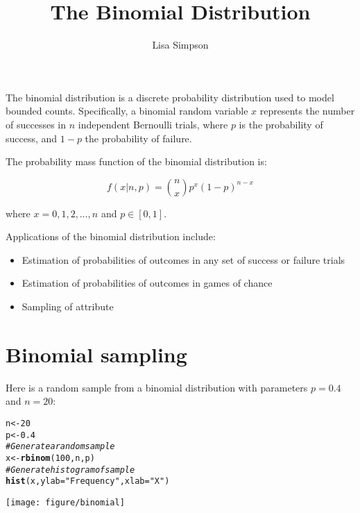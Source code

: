 \documentclass[11pt]{article}\usepackage[]{graphicx}\usepackage[]{color}
\title{The Binomial Distribution}
\author{Lisa Simpson}
\makeatletter
\def\maxwidth{ %
  \ifdim\Gin@nat@width>\linewidth
    \linewidth
  \else
    \Gin@nat@width
  \fi
}
\newcommand{\hlnum}[1]{\textcolor[rgb]{0.686,0.059,0.569}{#1}}%
\newcommand{\hlstr}[1]{\textcolor[rgb]{0.192,0.494,0.8}{#1}}%
\newcommand{\hlcom}[1]{\textcolor[rgb]{0.678,0.584,0.686}{\textit{#1}}}%
\newcommand{\hlstd}[1]{\textcolor[rgb]{0.345,0.345,0.345}{#1}}%
\newcommand{\hlkwb}[1]{\textcolor[rgb]{0.69,0.353,0.396}{#1}}%
\newcommand{\hlkwc}[1]{\textcolor[rgb]{0.333,0.667,0.333}{#1}}%
\newcommand{\hlkwd}[1]{\textcolor[rgb]{0.737,0.353,0.396}{\textbf{#1}}}%
\newenvironment{kframe}{%
 \def\at@end@of@kframe{}%
 \ifinner\ifhmode%
  \def\at@end@of@kframe{\end{minipage}}%
  \begin{minipage}{\columnwidth}%
 \fi\fi%
 \def\FrameCommand##1{\hskip\@totalleftmargin \hskip-\fboxsep
 \colorbox{shadecolor}{##1}\hskip-\fboxsep
     \hskip-\linewidth \hskip-\@totalleftmargin \hskip\columnwidth}%
 \MakeFramed {\advance\hsize-\width
   \@totalleftmargin\z@ \linewidth\hsize
   \@setminipage}}%
 {\par\unskip\endMakeFramed%
 \at@end@of@kframe}
\newenvironment{knitrout}{}{} %
\makeatother
\begin{document}

\maketitle %

The binomial distribution is a discrete probability distribution used to
model bounded counts. Specifically, a binomial random variable $x$ represents
the number of successes in $n$ independent Bernoulli trials, where $p$ is
the probability of success, and $1-p$ the probability of failure.


The probability mass function of the binomial distribution is:

\begin{equation}
	f(x | n,p) = {n \choose x} p^x (1-p)^{n-x} %
\end{equation}

\noindent where $x = 0,1,2,\ldots,n$ and $p \in [0,1]$.

Applications of the binomial distribution include:

\begin{itemize} %

	\item Estimation of probabilities of outcomes in any set of success or failure trials

	\item Estimation of probabilities of outcomes in games of chance

	\item Sampling of attribute

\end{itemize}

\section{Binomial sampling}

Here is a random sample from a binomial distribution with parameters $p=0.4$ and $n=20$:

\begin{knitrout}
\color{fgcolor}\begin{kframe}
\begin{alltt}
\hlstd{n} \hlkwb{<-} \hlnum{20}
\hlstd{p} \hlkwb{<-} \hlnum{0.4}
\hlcom{# Generate a random sample}
\hlstd{x} \hlkwb{<-} \hlkwd{rbinom}\hlstd{(}\hlnum{100}\hlstd{, n, p)}
\hlcom{# Generate histogram of sample}
\hlkwd{hist}\hlstd{(x,} \hlkwc{ylab} \hlstd{=} \hlstr{"Frequency"}\hlstd{,} \hlkwc{xlab} \hlstd{=} \hlstr{"X"}\hlstd{)}
\end{alltt}
\end{kframe}
\texttt{[image: figure/binomial]} 

\end{knitrout}
\end{document}

